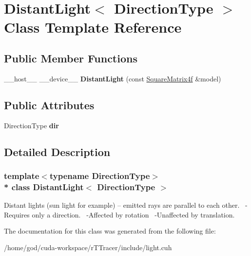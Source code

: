 \hypertarget{class_distant_light}{}\section{Distant\+Light$<$ Direction\+Type $>$ Class Template Reference}
\label{class_distant_light}
\subsection*{Public Member Functions}
\begin{DoxyCompactItemize}
\item 
\+\_\+\+\_\+host\+\_\+\+\_\+ \+\_\+\+\_\+device\+\_\+\+\_\+ {\bfseries Distant\+Light} (const \hyperlink{class_square_matrix4}{Square\+Matrix4f} \&model)\hypertarget{class_distant_light_a3565f9a26a0a865abf37c72ed63a7286}{}\label{class_distant_light_a3565f9a26a0a865abf37c72ed63a7286}

\end{DoxyCompactItemize}
\subsection*{Public Attributes}
\begin{DoxyCompactItemize}
\item 
Direction\+Type {\bfseries dir}\hypertarget{class_distant_light_a6931acb5c11fddc6a6ea27091ca7c95f}{}\label{class_distant_light_a6931acb5c11fddc6a6ea27091ca7c95f}

\end{DoxyCompactItemize}


\subsection{Detailed Description}
\subsubsection*{template$<$typename Direction\+Type$>$\\*
class Distant\+Light$<$ Direction\+Type $>$}

Distant lights (sun light for example) -- emitted rays are parallel to each other.~\newline
 -\/\+Requires only a direction.~\newline
 -\/\+Affected by rotation~\newline
 -\/\+Unaffected by translation.~\newline


The documentation for this class was generated from the following file\+:\begin{DoxyCompactItemize}
\item 
/home/god/cuda-\/workspace/r\+T\+Tracer/include/light.\+cuh\end{DoxyCompactItemize}
